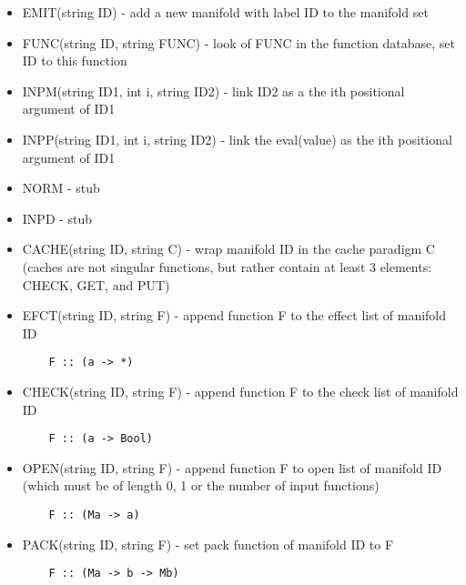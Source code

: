 \documentclass[12pt]{article}
\begin{document}
\begin{itemize}

  \item EMIT(string ID) - add a new manifold with label ID to the manifold set

  \item FUNC(string ID, string FUNC) - look of FUNC in the function database,
    set ID to this function

  \item INPM(string ID1, int i, string ID2) - link ID2 as a the ith positional
    argument of ID1

  \item INPP(string ID1, int i, string ID2) - link the eval(value) as the ith
    positional argument of ID1

  \item NORM - stub

  \item INPD - stub

  \item CACHE(string ID, string C) - wrap manifold ID in the cache paradigm C
    (caches are not singular functions, but rather contain at least 3 elements:
    CHECK, GET, and PUT)

  \item EFCT(string ID, string F) - append function F to the effect list of manifold ID

\begin{verbatim}
    F :: (a -> *) 
\end{verbatim}

  \item CHECK(string ID, string F) - append function F to the check list of manifold ID

\begin{verbatim}
    F :: (a -> Bool)  
\end{verbatim}

  \item OPEN(string ID, string F) - append function F to open list of manifold
    ID (which must be of length 0, 1 or the number of input functions)

\begin{verbatim}
    F :: (Ma -> a) 
\end{verbatim}

  \item PACK(string ID, string F) - set pack function of manifold ID to F
    
\begin{verbatim}
    F :: (Ma -> b -> Mb)
\end{verbatim}


\end{itemize}
\end{document}
